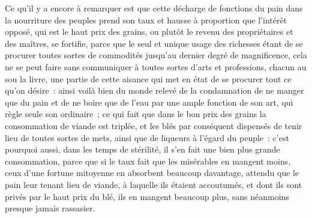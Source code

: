 \documentclass[french,twoside]{book} %
\begin{document}
Ce qu’il y a encore à remarquer est que cette décharge de fonctions du pain dans la nourriture des peuples prend son taux et hausse à proportion que l’intérêt opposé, qui est le haut prix des grains, ou plutôt le revenu des propriétaires et des maîtres, se fortifie, parce que le seul et unique usage des richesses étant de se procurer toutes sortes de commodités jusqu’au dernier degré de magnificence, cela ne se peut faire sans communiquer à toutes sortes d’arts et professions, chacun au sou la livre, une partie de cette aisance qui met en état de se procurer tout ce qu’on désire : ainsi voilà bien du monde relevé de la condamnation de ne manger que du pain et de ne boire que de l’eau par une ample fonction de son art, qui règle seule son ordinaire ; ce qui fait que dans le bon prix des grains la consommation de viande est triplée, et les blés par conséquent dispensés de tenir lieu de toutes sortes de mets, ainsi que de liqueurs à l’égard du peuple : c’est pourquoi aussi, dans les temps de stérilité, il s’en fait une bien plus grande consommation, parce que si le taux fait que les misérables en mangent moins, ceux d’une fortune mitoyenne en absorbent beaucoup davantage, attendu que le pain leur tenant lieu de viande, à laquelle ils étaient accoutumés, et dont ils sont privés par le haut prix du blé, ils en mangent beaucoup plus, sans néanmoins presque jamais rassasier.
\end{document}
